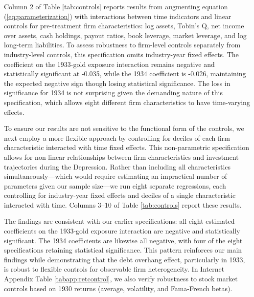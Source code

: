 Column 2 of Table \ref{tab:controls} reports results from augmenting equation (\ref{eq:parameterization}) with interactions between time indicators and linear controls for pre-treatment firm characteristics: log assets, Tobin's Q, net income over assets, cash holdings, payout ratios, book leverage, market leverage, and log long-term liabilities. To assess robustness to firm-level controls separately from industry-level controls, this specification omits industry-year fixed effects. The coefficient on the 1933-gold exposure interaction remains negative and statistically significant at -0.035, while the 1934 coefficient is -0.026, maintaining the expected negative sign though losing statistical significance. The loss in significance for 1934 is not surprising given the demanding nature of this specification, which allows eight different firm characteristics to have time-varying effects.

To ensure our results are not sensitive to the functional form of the controls, we next employ a more flexible approach by controlling for deciles of each firm characteristic interacted with time fixed effects. This non-parametric specification allows for non-linear relationships between firm characteristics and investment trajectories during the Depression. Rather than including all characteristics simultaneously---which would require estimating an impractical number of parameters given our sample size---we run eight separate regressions, each controlling for industry-year fixed effects and deciles of a single characteristic interacted with time. Columns 3--10 of Table \ref{tab:controls} report these results.

The findings are consistent with our earlier specifications: all eight estimated coefficients on the 1933-gold exposure interaction are negative and statistically significant. The 1934 coefficients are likewise all negative, with four of the eight specifications retaining statistical significance. This pattern reinforces our main findings while demonstrating that the debt overhang effect, particularly in 1933, is robust to flexible controls for observable firm heterogeneity. In Internet Appendix Table \ref{tabapp:retcontrol}, we also verify robustness to stock market controls based on 1930 returns (average, volatility, and Fama-French betas).

